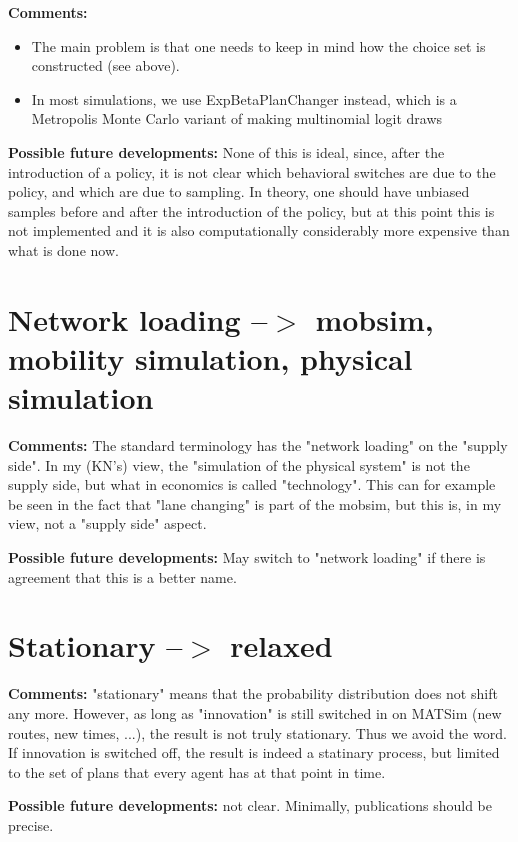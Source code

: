 \documentclass[a4paper,11pt]{report}
\begin{document}
\textbf{Comments:}
\begin{itemize}
	\item The main problem is that one needs to keep in mind how the choice set is constructed (see above).
	\item In most simulations, we use ExpBetaPlanChanger instead, which is a   Metropolis Monte Carlo variant of making multinomial logit draws
\end{itemize}

\textbf{Possible future developments:} None of this is  ideal,  since, after the introduction of a policy, it is not clear which   behavioral switches are due to the policy, and which are due to   sampling. In theory, one should have unbiased samples before and  after  the introduction of the policy, but at this point this is not   implemented and it is also computationally considerably more expensive   than what is done now.

\vfill\eject
\section{Network loading --$>$ mobsim, mobility simulation, physical simulation}


\textbf{Comments:} The standard terminology has the "network   loading" on the "supply  side". In my (KN's) view, the  "simulation of  the physical system" is  not the supply side, but what  in economics is  called "technology". This  can for example be  seen in the fact that  "lane changing" is part of the  mobsim, but this  is, in my view, not a  "supply side" aspect.

\textbf{Possible future developments:} May switch to "network loading" if there is agreement that this is a better name.

\vfill\eject
\section{Stationary --$>$ relaxed}

\textbf{Comments:} "stationary" means that the probability   distribution does not shift any  more. However, as long as  "innovation"  is still switched in on MATSim  (new routes, new times,  ...), the  result is not truly stationary. Thus  we avoid the  word. If innovation  is switched off, the result is indeed a   statinary process, but limited  to the set of plans that every agent has   at that point in time.

\textbf{Possible future developments:} not clear. Minimally, publications should be precise.
\end{document}

